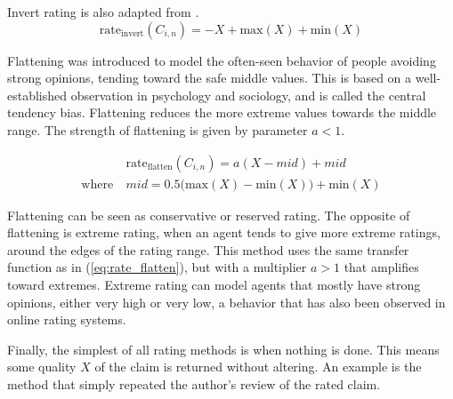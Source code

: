 \documentclass[%
    ]{\PathToTumTemplate/thesis/tum_thesis}
\begin{document}
Invert rating is also adapted from \cite{yu_detecting_2003}.
\begin{equation}\label{eq:rate_invert}
\mathrm{rate_{invert}}(C_{i,n}) = -X + \mathrm{max}(X) + \mathrm{min}(X)
\end{equation}

Flattening was introduced to model the often-seen behavior of people avoiding strong opinions, tending toward the safe middle values.
This is based on a well-established observation in psychology and sociology, and is called the central tendency bias\cite{kalton_effects_1980,lee_outlier_2004}.
Flattening reduces the more extreme values towards the middle range.
The strength of flattening is given by parameter $a < 1$.

\begin{equation}\label{eq:rate_flatten}
\begin{aligned}
&\mathrm{rate_{flatten}}(C_{i,n}) = a(X-mid)+mid \\
\mathrm{where~}&mid = 0.5\big(\mathrm{max}(X) - \mathrm{min}(X) \big) + \mathrm{min}(X)
\end{aligned}
\end{equation}

Flattening can be seen as conservative or reserved rating.
The opposite of flattening is extreme rating, when an agent tends to give more extreme ratings, around the edges of the rating range.
This method uses the same transfer function as in (\ref{eq:rate_flatten}), but with a multiplier $a > 1$ that amplifies toward extremes.
Extreme rating can model agents that mostly have strong opinions, either very high or very low, a behavior that has also been observed in online rating systems\cite{schoenmueller_extreme_2018}.

Finally, the simplest of all rating methods is when nothing is done.
This means some quality $X$ of the claim is returned without altering.
An example is the method that simply repeated the author's review of the rated claim.
\end{document}
